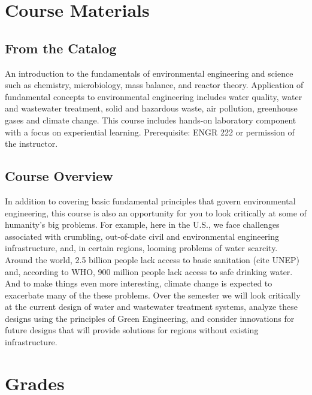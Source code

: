 \documentclass[a4paper, 12pt]{article}
\begin{document}
\section *{Course Materials}
\subsection *{From the Catalog}
An introduction to the fundamentals of environmental engineering and science such as chemistry, microbiology, mass balance, and reactor theory. Application of fundamental concepts to environmental engineering includes water quality, water and wastewater treatment, solid and hazardous waste, air pollution, greenhouse gases and climate change. This course includes hands-on laboratory component with a focus on experiential learning. Prerequisite: ENGR 222 or permission of the instructor.
\subsection *{Course Overview}
In addition to covering basic fundamental principles that govern environmental engineering,   this course is also an opportunity for you to look critically at some of humanity's big problems.  For example, here in the U.S., we face challenges associated with crumbling, out-of-date civil and environmental engineering infrastructure, and, in certain regions, looming problems of water scarcity. Around the world, 2.5 billion people lack access to basic sanitation (cite UNEP) and, according to WHO, 900 million people lack access to safe drinking water.  And to make things even more interesting, climate change is expected to exacerbate many of the these problems.  Over the semester we will look critically at the current design of water and wastewater treatment systems, analyze these designs using the principles of Green Engineering, and consider innovations for future designs that will provide solutions for regions without existing infrastructure. 

\section *{Grades}







\end{document}
